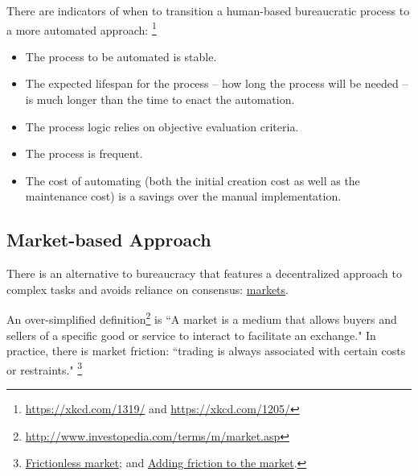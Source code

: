 There are indicators of when to transition a human-based bureaucratic process to a more automated approach:
\footnote{\href{https://xkcd.com/1319/}{https://xkcd.com/1319/} and \href{https://xkcd.com/1205/}{https://xkcd.com/1205/}}
\begin{itemize}
    \item The process to be automated is stable.
    \item The expected lifespan for the process -- how long the process will be needed -- is much longer than the time to enact the automation.
\item The process logic relies on objective evaluation criteria.  
\item The process is frequent.
\item The cost of automating (both the initial creation cost as well as the maintenance cost) is a savings over the manual implementation.
\end{itemize}


\subsection*{Market-based Approach}

There is an alternative to bureaucracy that features a decentralized approach to complex tasks and avoids reliance on consensus: \href{https://en.wikipedia.org/wiki/Market_(economics)}{markets}.

An over-simplified definition\footnote{\href{http://www.investopedia.com/terms/m/market.asp}{http://www.investopedia.com/terms/m/market.asp}} is ``A market is a medium that allows buyers and sellers of a specific good or service to interact to facilitate an exchange." 
In practice, there is market friction: ``trading is always associated with certain costs or restraints."
\footnote{\href{http://www.investopedia.com/terms/f/frictionlessmarket.asp}{Frictionless market};
and \href{https://insight.kellogg.northwestern.edu/article/adding_friction_to_the_market}{Adding friction to the market}.}

